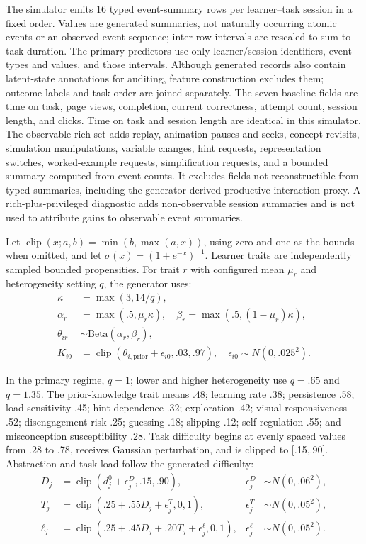 \documentclass[11pt]{article}
\newcommand{\clip}{\operatorname{clip}}
\begin{document}
The simulator emits 16 typed event-summary rows per learner–task session in a fixed order. Values are generated summaries, not naturally occurring atomic events or an observed event sequence; inter-row intervals are rescaled to sum to task duration. The primary predictors use only learner/session identifiers, event types and values, and those intervals. Although generated records also contain latent-state annotations for auditing, feature construction excludes them; outcome labels and task order are joined separately. The seven baseline fields are time on task, page views, completion, current correctness, attempt count, session length, and clicks. Time on task and session length are identical in this simulator. The observable-rich set adds replay, animation pauses and seeks, concept revisits, simulation manipulations, variable changes, hint requests, representation switches, worked-example requests, simplification requests, and a bounded summary computed from event counts. It excludes fields not reconstructible from typed summaries, including the generator-derived productive-interaction proxy. A rich-plus-privileged diagnostic adds non-observable session summaries and is not used to attribute gains to observable event summaries.

Let $\clip(x;a,b)=\min(b,\max(a,x))$, using zero and one as the bounds when omitted, and let $\sigma(x)=(1+e^{-x})^{-1}$. Learner traits are independently sampled bounded propensities. For trait $r$ with configured mean $\mu_r$ and heterogeneity setting $q$, the generator uses:
\begin{equation}
\begin{aligned}
\kappa &= \max(3, 14/q),\\
\alpha_r &= \max(.5, \mu_r\kappa), \quad \beta_r = \max(.5, (1-\mu_r)\kappa),\\
\theta_{ir} &\sim \mathrm{Beta}(\alpha_r, \beta_r),\\
K_{i0} &= \clip(\theta_{i,\mathrm{prior}} + \epsilon_{i0}, .03, .97), \quad \epsilon_{i0} \sim N(0, .025^2).
\end{aligned}
\end{equation}

In the primary regime, $q=1$; lower and higher heterogeneity use $q=.65$ and $q=1.35$. The prior-knowledge trait means .48; learning rate .38; persistence .58; load sensitivity .45; hint dependence .32; exploration .42; visual responsiveness .52; disengagement risk .25; guessing .18; slipping .12; self-regulation .55; and misconception susceptibility .28. Task difficulty begins at evenly spaced values from .28 to .78, receives Gaussian perturbation, and is clipped to [.15,.90]. Abstraction and task load follow the generated difficulty:
\begin{equation}
\begin{aligned}
D_j &= \clip(d_j^0 + \epsilon_j^D, .15, .90), & \epsilon_j^D &\sim N(0, .06^2),\\
T_j &= \clip(.25 + .55D_j + \epsilon_j^T, 0, 1), & \epsilon_j^T &\sim N(0, .05^2),\\
\ell_j &= \clip(.25 + .45D_j + .20T_j + \epsilon_j^\ell, 0, 1), & \epsilon_j^\ell &\sim N(0, .05^2).
\end{aligned}
\end{equation}
\end{document}
